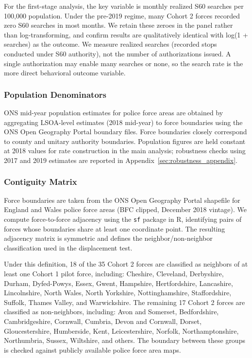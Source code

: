 \documentclass[12pt]{article}
\begin{document}
For the first-stage analysis, the key variable is monthly realized S60 searches per 100,000 population. Under the pre-2019 regime, many Cohort 2 forces recorded zero S60 searches in most months. We retain these zeroes in the panel rather than log-transforming, and confirm results are qualitatively identical with log(1 + searches) as the outcome. We measure realized searches (recorded stops conducted under S60 authority), not the number of authorizations issued. A single authorization may enable many searches or none, so the search rate is the more direct behavioral outcome variable.

\subsubsection*{Population Denominators}

ONS mid-year population estimates for police force areas are obtained by aggregating LSOA-level estimates (2018 mid-year) to force boundaries using the ONS Open Geography Portal boundary files. Force boundaries closely correspond to county and unitary authority boundaries. Population figures are held constant at 2018 values for rate construction in the main analysis; robustness checks using 2017 and 2019 estimates are reported in Appendix~\ref{sec:robustness_appendix}.

\subsubsection*{Contiguity Matrix}

Force boundaries are taken from the ONS Open Geography Portal shapefile for England and Wales police force areas (BFC clipped, December 2018 vintage). We compute force-to-force adjacency using the \texttt{sf} package in R, identifying pairs of forces whose boundaries share at least one coordinate point. The resulting adjacency matrix is symmetric and defines the neighbor/non-neighbor classification used in the displacement test.

Under this definition, 18 of the 35 Cohort 2 forces are classified as neighbors of at least one Cohort 1 pilot force, including: Cheshire, Cleveland, Derbyshire, Durham, Dyfed-Powys, Essex, Gwent, Hampshire, Hertfordshire, Lancashire, Lincolnshire, North Wales, North Yorkshire, Nottinghamshire, Staffordshire, Suffolk, Thames Valley, and Warwickshire. The remaining 17 Cohort 2 forces are classified as non-neighbors, including: Avon and Somerset, Bedfordshire, Cambridgeshire, Cornwall, Cumbria, Devon and Cornwall, Dorset, Gloucestershire, Humberside, Kent, Leicestershire, Norfolk, Northamptonshire, Northumbria, Sussex, Wiltshire, and others. The boundary between these groups is checked against publicly available police force area maps.
\end{document}
